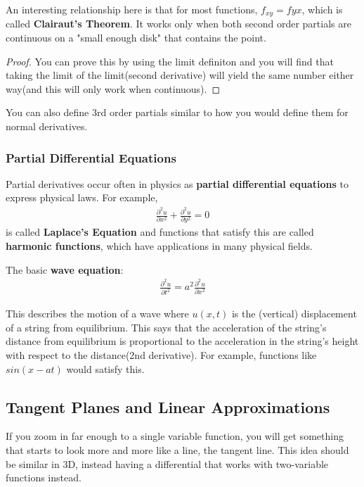 \documentclass{article}
\newcommand{\p}{\partial}
\begin{document}
An interesting relationship here is that for most functions, $f_{xy} = f{yx}$, which is called \textbf{Clairaut's Theorem}. It works only when both second order partials are continuous on a "small enough disk" that contains the point.
\begin{proof}
You can prove this by using the limit definiton and you will find that taking the limit of the limit(second derivative) will yield the same number either way(and this will only work when continuous).
\end{proof}

You can also define 3rd order partials similar to how you would define them for normal derivatives.
\subsubsection{Partial Differential Equations}
Partial derivatives occur often in physics as \textbf{partial differential equations} to express physical laws. For example,
\begin{gather*}
    \frac{\p^2 u}{\p x^2} + \frac{\p^2 u}{\p y^2} = 0
\end{gather*}
is called \textbf{Laplace's Equation} and functions that satisfy this are called \textbf{harmonic functions}, which have applications in many physical fields.

The basic \textbf{wave equation}:
\begin{gather*}
    \frac{\p^2 u}{\p t^2} = a^2 \frac{\p^2 u}{\p x^2}
\end{gather*}

This describes the motion of a wave where $u(x,t)$ is the (vertical) displacement of a string from equilibrium. This says that the acceleration of the string's distance from equilibrium is proportional to the acceleration in the string's height with respect to the distance(2nd derivative). For example, functions like $sin(x - at)$ would satisfy this.

\subsection{Tangent Planes and Linear Approximations}
If you zoom in far enough to a single variable function, you will get something that starts to look more and more like a line, the tangent line. This idea should be similar in 3D, instead having a differential that works with two-variable functions instead.
\end{document}
